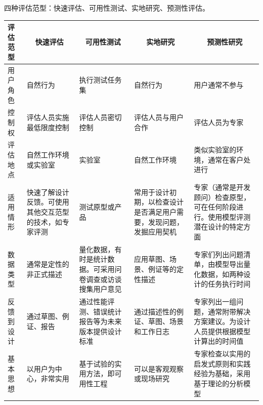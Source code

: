 \begin{solution}
四种评估范型：快速评估、可用性测试、实地研究、预测性评估。
\vspace{-0.5em}
\begin{spacing}{1.2}
    \centering
    \begin{longtable}{|m{2cm}<{\centering}|m{2.9cm}|m{2.9cm}|m{2.9cm}|m{3cm}|}
        \hline
        \textbf{评估范型} & \multicolumn{1}{c|}{\textbf{快速评估}} & \multicolumn{1}{c|}{\textbf{可用性测试}} & \multicolumn{1}{c|}{\textbf{实地研究}} & \multicolumn{1}{c|}{\textbf{预测性研究}} \\ \hline
        用户角色 & 自然行为 & 执行测试任务集 & 自然行为 & 用户通常不参与 \\ \hline
        控制权 & 评估人员实施最低限度控制 & 评估人员密切控制 & 评估人员与用户合作 & 评估人员为专家 \\ \hline
        评估地点 & 自然工作环境或实验室 & 实验室 & 自然工作环境 & 类似实验室的环境，通常在客户处进行 \\ \hline
        适用情形 & 快速了解设计反馈。可使用其他交互范型的技术，如专家评测 & 测试原型或产品 & 常用于设计初期，以检查设计是否满足用户需要，发现问题，发掘应用契机 & 专家（通常是开发顾问）检查原型，可在任何阶段进行。使用模型评测潜在设计的特定方面 \\ \hline
        数据类型 & 通常是定性的非正式描述 & 量化数据，有时是统计数据。可采用问卷调查或访谈搜集用户意见 & 应用草图、场景、例证等的定性描述 & 专家们列出问题清单，由模型导出量化数据，如两种设计的任务执行时间 \\ \hline
        反馈到设计 & 通过草图、例证、报告 & 通过性能评测、错误统计报告等为未来版本提供设计标准 & 通过描述性的例证、草图、场景和工作日志 & 专家列出一组问题，通常附带解决方案建议。为设计人员提供根据模型计算出的时间值 \\ \hline
        基本思想 & 以用户为中心，非常实用 & 基于试验的实用方法，即可用性工程 & 可以是客观观察或现场研究 & 专家检查以实用的启发式原则和实践经验为基础，采用基于理论的分析模型\\ \hline
    \end{longtable}
	\end{spacing}
\vspace{-1em}
\end{solution}